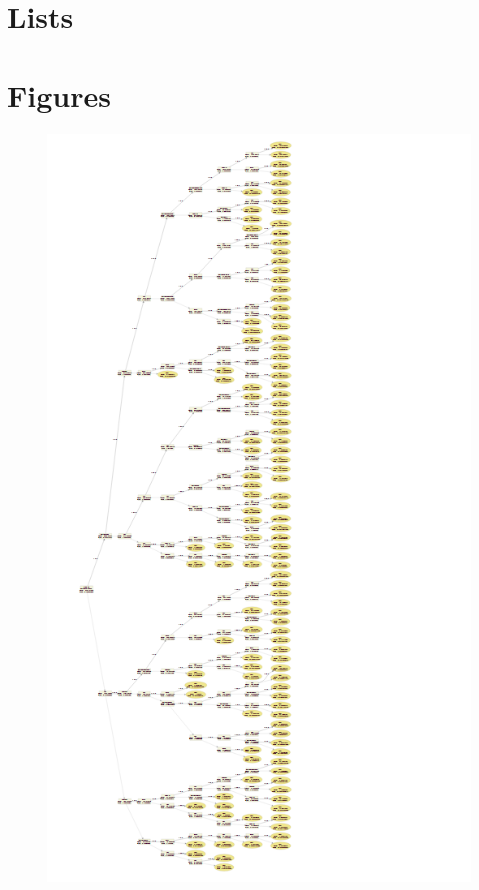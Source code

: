 \documentclass[12pt, twoside,openany]{book} %
\begin{document}
\begin{appendices}
\chapter{Lists}


\chapter{Figures}

\begin{figure}[ht]
\small{

\includegraphics[width=\textwidth, height=\dimexpr
  \textheight-4\baselineskip-\parskip-.2em-
  \abovecaptionskip-\belowcaptionskip\relax]{ml1_dtree_full.png}

}
\end{figure}
\end{appendices}
\end{document}

